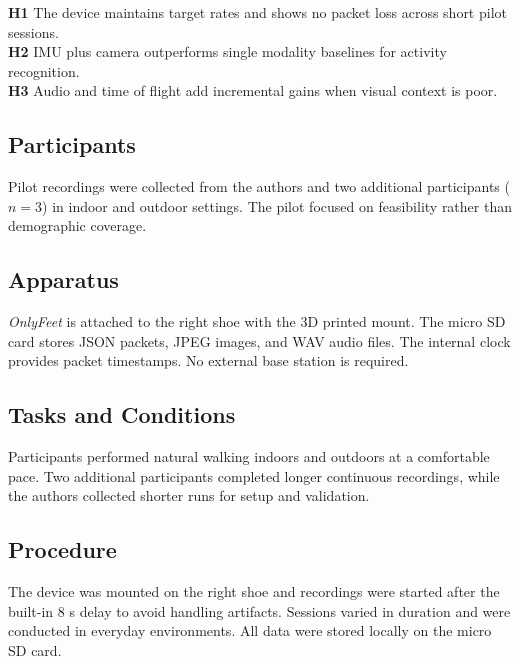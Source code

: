 \documentclass[manuscript,review,anonymous]{acmart}
\begin{document}
\noindent\textbf{H1} The device maintains target rates and shows no packet loss across short pilot sessions. \\
\textbf{H2} IMU plus camera outperforms single modality baselines for activity recognition. \\
\textbf{H3} Audio and time of flight add incremental gains when visual context is poor.

\subsection{Participants}
Pilot recordings were collected from the authors and two additional participants (\(n=3\)) in indoor and outdoor settings. The pilot focused on feasibility rather than demographic coverage.

\subsection{Apparatus}
\textit{OnlyFeet} is attached to the right shoe with the 3D printed mount. The micro SD card stores JSON packets, JPEG images, and WAV audio files. The internal clock provides packet timestamps. No external base station is required.

\subsection{Tasks and Conditions}
Participants performed natural walking indoors and outdoors at a comfortable pace. Two additional participants completed longer continuous recordings, while the authors collected shorter runs for setup and validation.

\subsection{Procedure}
The device was mounted on the right shoe and recordings were started after the built-in 8 s delay to avoid handling artifacts. Sessions varied in duration and were conducted in everyday environments. All data were stored locally on the micro SD card.
\end{document}
